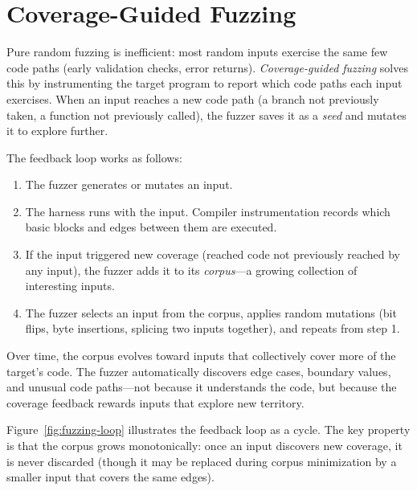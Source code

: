 \section{Coverage-Guided Fuzzing}
\label{sec:fuzzing:coverage}

%
Pure random fuzzing is inefficient: most random inputs exercise the same few code paths (early validation checks, error returns). \emph{Coverage-guided fuzzing} solves this by instrumenting the target program to report which code paths each input exercises. When an input reaches a new code path (a branch not previously taken, a function not previously called), the fuzzer saves it as a \emph{seed} and mutates it to explore further.

The feedback loop works as follows:
\begin{enumerate}
  \item The fuzzer generates or mutates an input.
  \item The harness runs with the input. Compiler instrumentation records which basic blocks and edges between them are executed.
  \item If the input triggered new coverage (reached code not previously reached by any input), the fuzzer adds it to its \emph{corpus}---a growing collection of interesting inputs.
  \item The fuzzer selects an input from the corpus, applies random mutations (bit flips, byte insertions, splicing two inputs together), and repeats from step 1.
\end{enumerate}

Over time, the corpus evolves toward inputs that collectively cover more of the target's code. The fuzzer automatically discovers edge cases, boundary values, and unusual code paths---not because it understands the code, but because the coverage feedback rewards inputs that explore new territory.

Figure~\ref{fig:fuzzing-loop} illustrates the feedback loop as a cycle. The key property is that the corpus grows monotonically: once an input discovers new coverage, it is never discarded (though it may be replaced during corpus minimization by a smaller input that covers the same edges).

